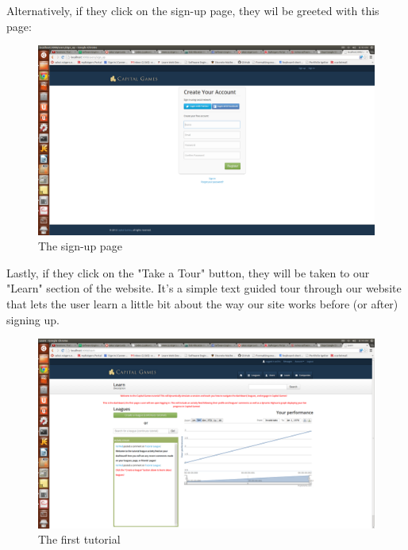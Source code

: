 Alternatively, if they click on the sign-up page, they wil be greeted with this page:
\begin{figure}[H]
\centering
\includegraphics[width=5.5in]{./img/finalDesign/signup.png}
\caption{The sign-up page}
\end{figure}
Lastly, if they click on the "Take a Tour" button, they will be taken to our "Learn" section of the website. It's a simple text guided tour through our website that lets the user learn a little bit about the way our site works before (or after) signing up.
\begin{figure}[H]
\centering
\includegraphics[width=5.5in]{./img/finalDesign/tutorial.png}
\caption{The first tutorial}
\end{figure}
